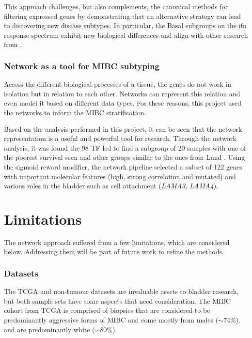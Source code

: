 This approach challenges, but also complements, the canonical methods for filtering expressed genes by demonstrating that an alternative strategy can lead to discovering new disease subtypes. In particular, the Basal subgroups on the \acrshort{ifn} response spectrum exhibit new biological differences and align with other research from \citep{Marzouka2018-ge,Baker2022-bj}.


\subsubsection*{Network as a tool for MIBC subtyping}

Across the different biological processes of a tissue, the genes do not work in isolation but in relation to each other. Networks can represent this relation and even model it based on different data types. For these reasons, this project used the networks to inform the MIBC stratification. 

Based on the analysis performed in this project, it can be seen that the network representation is a useful and powerful tool for research. Through the network analysis, it was found the 98 TF led to find a subgroup of 20 samples with one of the poorest survival seen and other groups similar to the ones from Lund \citep{Marzouka2018-ge, Baker2022-bj}. Using the sigmoid reward modifier, the network pipeline selected a subset of 122 genes with important molecular features (high, strong correlation and mutated) and various roles in the bladder such as cell attachment (\textit{LAMA3, LAMA4}).

\section{Limitations} \label{s:limitations}

The network approach suffered from a few limitations, which are considered below. Addressing them will be part of future work to refine the methods.

\subsubsection*{Datasets}

The TCGA and non-tumour datasets are invaluable assets to bladder research, but both sample sets have some aspects that need consideration. The MIBC cohort from TCGA is comprised of biopsies that are considered to be predominantly aggressive forms of MIBC and come mostly from males (\(\sim\)74\%). and are predominantly white (\(\sim\)80\%).

